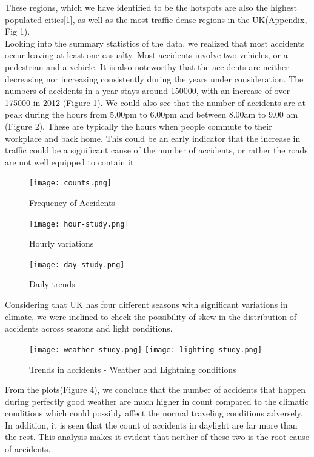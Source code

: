 \documentclass{neu_handout}
\begin{document}
These regions, which we have identified to be the hotspots are also the highest populated cities[1], as well as the most traffic dense regions in the UK(Appendix, Fig 1). \\

Looking into the summary statistics of the data, we realized that most accidents occur leaving at least one casualty. Most accidents involve two vehicles, or a pedestrian and a vehicle. It is also noteworthy that the accidents are neither decreasing nor increasing consistently during the years under consideration. The numbers of accidents in a year stays around 150000, with  an increase of over 175000 in 2012 (Figure 1). We could also see that the number of accidents are at peak during the hours from 5.00pm to 6.00pm and between 8.00am to 9.00 am (Figure 2). These are typically the hours when people commute to their workplace and back home. This could be an early indicator that the increase in traffic could be a significant cause of the number of accidents, or rather the roads are not well equipped to contain it. \\

\begin{figure}[!htb]
  \texttt{[image: counts.png]}
  \caption{Frequency of Accidents}\label{fig:frequency}
\endminipage\hfill
{}
  \texttt{[image: hour-study.png]}
  \caption{Hourly variations}\label{fig:hour-study}
\endminipage\hfill
{}
  \texttt{[image: day-study.png]}
  \caption{Daily trends}\label{fig:day_study}
\endminipage
\end{figure}

Considering that UK has four different seasons with significant variations in climate, we were inclined to check the possibility of skew in the distribution of accidents across seasons
and light conditions. \\

\begin{figure}[!htb]
  \texttt{[image: weather-study.png]}
\endminipage\hfill
{}
  \texttt{[image: lighting-study.png]}
  \endminipage
\caption{Trends in accidents - Weather and Lightning conditions}  
\end{figure}

From the plots(Figure 4), we conclude that the number of accidents that happen during perfectly good weather are much higher in count compared to the climatic conditions which could possibly affect the normal traveling conditions adversely. In addition, it is seen that the count of accidents in daylight are far more than the rest. This analysis makes it evident that neither of these two is the root cause of accidents. \\
\end{document}
